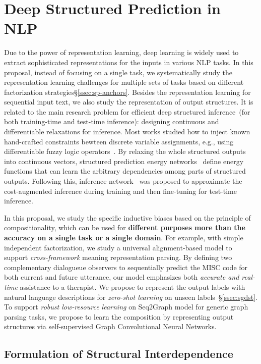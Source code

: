 \section{Deep Structured Prediction in NLP}
\label{sec:deepsp}
Due to the power of representation learning, deep learning is widely
used to extract sophisticated representations for the inputs in
various NLP tasks. In this proposal, instead of focusing on a single
task, we systematically study the representation learning challenges
for multiple sets of tasks based on different factorization
strategies\S\ref{ssec:sp-anchors}. Besides the representation learning
for sequential input text, we also study the representation of output
structures. It is related to the main research problem for efficient
deep structured inference~(for both training-time and test-time
inference): designing continuous and differentiable relaxations for
 inference. Most works studied how to inject known
hand-crafted constraints bewteen discrete variable assignments, e.g.,
using differentiable fuzzy logic
operators~\citet{li2019augmenting}. By relaxing the whole structured
outputs into continuous vectors, structured prediction energy
networks~\cite[SPEN,][]{belanger2016structured} define energy
functions that can learn the arbitrary dependencies among parts of
structured outputs. Following this, inference
network~\cite{tu2018learning} was proposed to approximate the
cost-augmented inference during training and then fine-tuning for
test-time inference.

In this proposal, we study the specific inductive biases based on the
principle of compositionality, which can be used for \textbf{different
  purposes more than the accuracy on a single task or a single
  domain}. For example, with simple independent factorization, we
study a universal alignment-based model to support
\textit{cross-framework} meaning representation parsing. By defining
two complementary dialogueue observers to sequentially predict the MISC
code for both current and future utterance, our model emphasizes both
\textit{accurate and real-time} assistance to a therapist. We propose
to represent the output labels with natural language descriptions for
\textit{zero-shot learning} on unseen labels~\S\ref{ssec:sgdst}. To
support \textit{robust low-resource learning} on Seq2Graph model for
generic graph parsing tasks, we propose to learn the composition by
representing output structures via self-supervised Graph Convolutional
Neural Networks.

\subsection{Formulation of Structural Interdependence}

